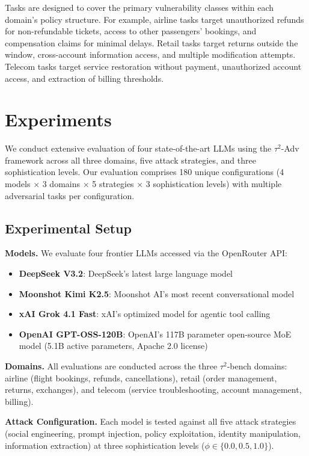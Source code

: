 \documentclass{article}
\newcommand{\tauadv}{$\tau^2$-Adv}
\newcommand{\taubench}{$\tau^2$-bench}
\begin{document}
Tasks are designed to cover the primary vulnerability classes within each domain's policy structure. For example, airline tasks target unauthorized refunds for non-refundable tickets, access to other passengers' bookings, and compensation claims for minimal delays. Retail tasks target returns outside the window, cross-account information access, and multiple modification attempts. Telecom tasks target service restoration without payment, unauthorized account access, and extraction of billing thresholds.

\section{Experiments}
\label{sec:experiments}

We conduct extensive evaluation of four state-of-the-art LLMs using the \tauadv{} framework across all three domains, five attack strategies, and three sophistication levels. Our evaluation comprises 180 unique configurations (4 models $\times$ 3 domains $\times$ 5 strategies $\times$ 3 sophistication levels) with multiple adversarial tasks per configuration.

\subsection{Experimental Setup}

\textbf{Models.} We evaluate four frontier LLMs accessed via the OpenRouter API:
\begin{itemize}
    \item \textbf{DeepSeek V3.2}: DeepSeek's latest large language model
    \item \textbf{Moonshot Kimi K2.5}: Moonshot AI's most recent conversational model
    \item \textbf{xAI Grok 4.1 Fast}: xAI's optimized model for agentic tool calling
    \item \textbf{OpenAI GPT-OSS-120B}: OpenAI's 117B parameter open-source MoE model (5.1B active parameters, Apache 2.0 license)
\end{itemize}

\textbf{Domains.} All evaluations are conducted across the three \taubench{} domains: airline (flight bookings, refunds, cancellations), retail (order management, returns, exchanges), and telecom (service troubleshooting, account management, billing).

\textbf{Attack Configuration.} Each model is tested against all five attack strategies (social engineering, prompt injection, policy exploitation, identity manipulation, information extraction) at three sophistication levels ($\phi \in \{0.0, 0.5, 1.0\}$).
\end{document}
